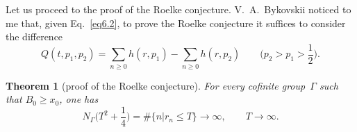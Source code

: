 \documentclass{amsart}
\theoremstyle{plain}
\newtheorem{theorem}{Theorem}
\theoremstyle{definition}
\numberwithin{equation}{section}
\begin{document}
Let us proceed to the proof of the Roelke conjecture.
V.~A.~Bykovskii noticed to me that, given Eq.~\eqref{eq6.2}, to
prove the Roelke conjecture it suffices to consider the difference
\begin{equation}
\label{eq6.41}
Q(t,p_{1},p_{2})= \sum_{n \geqslant 0}h(r,p_1)-\sum_{n \geqslant 0}h(r,p_2)\qquad
\biggl(p_2>p_1>\frac12\biggr).
\end{equation}

\begin{theorem}[\rm proof of the Roelke conjecture]
\label{th2} For every cofinite group~$\Gamma$ such that $B_0
\geqslant x_0$, one has
\begin{equation}
\label{eq6.41}
N_\Gamma\biggl(T^2+\frac14\biggr)=\#\{n|r_n \leqslant T\}\to\infty,\qquad
T\to\infty.
\end{equation}
\end{theorem}
\end{document}
